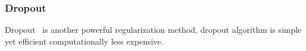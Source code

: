 \subsubsection{Dropout}

Dropout~\cite{JMLR:v15:srivastava14a} is another powerful regularization method, dropout algorithm is simple yet efficient   computationally less expensive. 